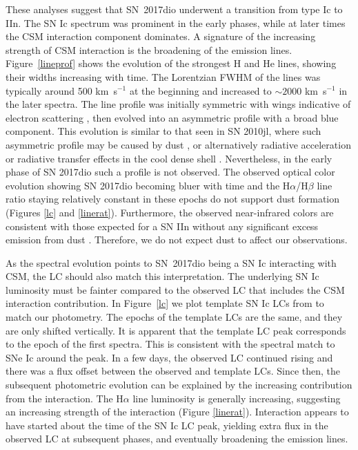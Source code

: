 \documentclass[twocolumn]{aastex61}
\begin{document}
These analyses suggest that SN~2017dio underwent a transition from type Ic to IIn. The SN Ic spectrum was prominent in the early phases, while at later times the CSM interaction component dominates. 
A signature of the increasing strength of CSM interaction is the broadening of the emission lines. Figure~\ref{lineprof} shows the evolution of the strongest H and He lines, showing {their} widths increas{ing} with time. {The} Lorentzian FWHM of the lines was typically around 500 km~s$^{-1}$ at the beginning and increased to $\sim2000$ km~s$^{-1}$ in the later spectra. 
The line profile was initially symmetric with wings indicative of electron scattering \citep[e.g.][]{dessart16}, then evolved into an asymmetric profile with a broad blue component.
{This evolution is similar to that seen in SN 2010jl, where such asymmetric profile may be caused by dust \citep[][]{gall14}, or alternatively radiative acceleration or radiative transfer effects in the cool dense shell \citep{fransson14}. }
Nevertheless, in the early phase of SN 2017dio such a profile is not observed.
The observed optical color evolution showing SN 2017dio becoming bluer with time and the H$\alpha$/H$\beta$ line ratio staying relatively constant in these epochs do not support dust formation (Figures \ref{lc} and \ref{linerat}). Furthermore, the observed near-infrared colors are consistent with those expected for a SN IIn without any significant excess emission from dust \citep{taddia13}. 
Therefore, we do not expect dust to affect our observations.


As the spectral evolution points to SN~2017dio being a SN Ic interacting with CSM, the LC should also match this interpretation. The underlying SN Ic luminosity must be fainter compared to the observed LC that includes the CSM interaction contribution. 
In Figure~\ref{lc} we plot template SN Ic LCs from \citet{taddia15} to match our photometry. The epochs of the template LCs are the same, and they are only shifted vertically. It is apparent that the template LC peak corresponds to the epoch of the first spectra. This is consistent with the spectral match to SNe Ic around the peak. In a few days, the observed LC continued rising and there was a flux offset between the observed and template LCs. 
Since then, the subsequent photometric evolution can be explained by the increasing contribution from the interaction. The H$\alpha$ line luminosity is generally increasing, suggesting an increasing strength of the interaction (Figure \ref{linerat}).
Interaction appears to {have} start{ed} about the time of the SN Ic LC peak, yielding extra flux in the observed LC at subsequent phases, and eventually broadening the emission lines.
\end{document}
